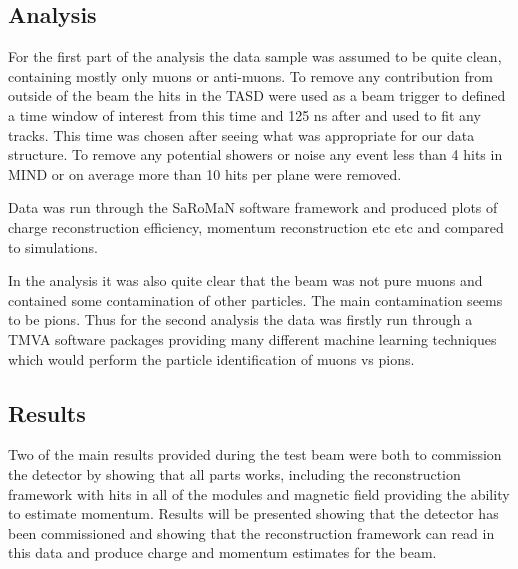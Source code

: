 \subsection{Analysis}

For the first part of the analysis the data sample was assumed to be quite clean, containing mostly only muons or anti-muons. To remove any contribution from outside of the beam the hits in the TASD were used as a beam trigger to defined a time window of  interest from this time and 125 ns after and used to fit any tracks. This time was chosen after seeing what was appropriate for our data structure. To remove any potential showers or noise any event less than 4 hits in MIND or on average more than 10 hits per plane were removed.

Data was run through the SaRoMaN software framework and produced plots of charge reconstruction efficiency, momentum reconstruction etc etc and compared to simulations.

In the analysis it was also quite clear that the beam was not pure muons and contained some contamination of other particles. The main contamination seems to be pions. Thus for the second analysis the data was firstly run through a TMVA software packages providing many different machine learning techniques which would perform the particle identification of muons vs pions.








\subsection{Results}
Two of the main results provided during the test beam were both to commission the detector by showing that all parts works, including the reconstruction framework with hits in all of the modules and magnetic field providing the ability to estimate momentum. Results will be presented showing that the detector has been commissioned and showing that the reconstruction framework can read in this data and produce charge and momentum estimates for the beam.

